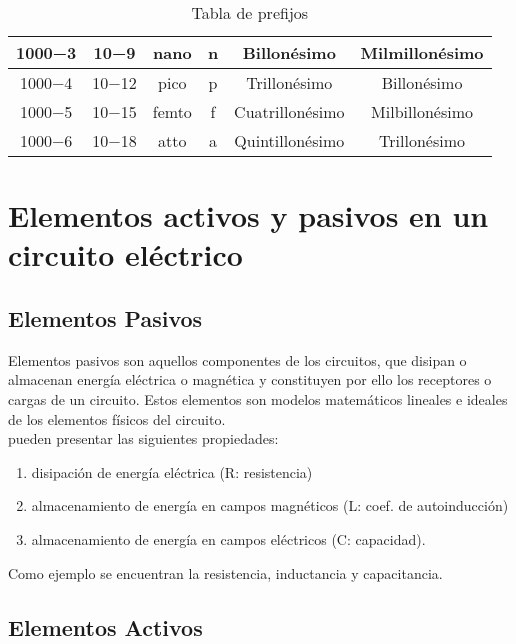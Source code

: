 \documentclass{article}
\begin{document}
\begin{table}[h!]
\begin{tabular}{|c|c|c|c|c|c|}
1000−3   & 10−9  & nano        & n            & Billonésimo       & Milmillonésimo          \\ \hline
1000−4   & 10−12 & pico        & p            & Trillonésimo      & Billonésimo             \\ \hline
1000−5   & 10−15 & femto       & f            & Cuatrillonésimo   & Milbillonésimo          \\ \hline
1000−6   & 10−18 & atto        & a            & Quintillonésimo   & Trillonésimo            \\ \hline
\end{tabular}
\caption{Tabla de prefijos \citep{PSI}}
\label{my-label}
\end{table}

\section{Elementos activos y pasivos en un circuito eléctrico}

\subsection{Elementos Pasivos}

Elementos pasivos son aquellos componentes de los circuitos, que disipan o almacenan energía eléctrica o magnética y constituyen por ello los receptores o cargas de un circuito. Estos elementos son modelos matemáticos lineales e ideales de los elementos físicos del circuito.\citep{EAP}\\

pueden presentar las siguientes propiedades:

\begin{enumerate}
    \item disipación de energía eléctrica (R: resistencia)
    \item almacenamiento de energía en campos magnéticos (L: coef. de autoinducción)
    \item almacenamiento de energía en campos eléctricos (C: capacidad).
\end{enumerate}
 
 Como ejemplo se encuentran la resistencia, inductancia y capacitancia.\citep{EAP}\\
 
 \subsection{Elementos Activos}
 
\end{document}
